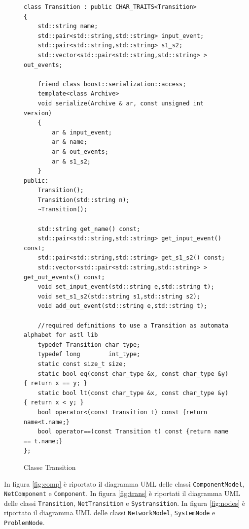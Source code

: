 \begin{figure}[htbp]
\centering
\begin{verbatim}
class Transition : public CHAR_TRAITS<Transition>
{
    std::string name;
    std::pair<std::string,std::string> input_event;
    std::pair<std::string,std::string> s1_s2;
    std::vector<std::pair<std::string,std::string> > out_events;

    friend class boost::serialization::access;
    template<class Archive>
    void serialize(Archive & ar, const unsigned int version)
    {
        ar & input_event;
        ar & name;
        ar & out_events;
        ar & s1_s2;
    }
public:
    Transition();
    Transition(std::string n);
    ~Transition();

    std::string get_name() const;
    std::pair<std::string,std::string> get_input_event() const;
    std::pair<std::string,std::string> get_s1_s2() const;
    std::vector<std::pair<std::string,std::string> > get_out_events() const;
    void set_input_event(std::string e,std::string t);
    void set_s1_s2(std::string s1,std::string s2);
    void add_out_event(std::string e,std::string t);

    //required definitions to use a Transition as automata alphabet for astl lib
    typedef Transition char_type;
    typedef long        int_type;
    static const size_t size;
    static bool eq(const char_type &x, const char_type &y) { return x == y; }
    static bool lt(const char_type &x, const char_type &y) { return x < y; }
    bool operator<(const Transition t) const {return name<t.name;}
    bool operator==(const Transition t) const {return name == t.name;}
};
\end{verbatim}
\caption{Classe Transition}
\label{class_trans}
\end{figure}

In figura \ref{fig:comp} è riportato il diagramma UML delle classi \verb|ComponentModel|, \verb|NetComponent| e \verb|Component|.
In figura \ref{fig:trans} è riportati il diagramma UML delle classi \verb|Transition|, \verb|NetTransition| e \verb|Systransition|.
In figura \ref{fig:nodes} è riportato il diagramma UML delle classi \verb|NetworkModel|, \verb|SystemNode| e \verb|ProblemNode|.

